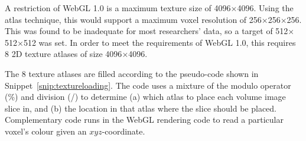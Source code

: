 A restriction of WebGL 1.0 is a maximum texture size of 4096$\times$4096.
Using the atlas technique, this would support a maximum voxel resolution of 256$\times$256$\times$256.
This was found to be inadequate for most researchers' data, so a target of 512$\times$512$\times$512 was set.
In order to meet the requirements of WebGL 1.0, this requires 8 2D texture atlases of size 4096$\times$4096.

The 8 texture atlases are filled according to the pseudo-code shown in Snippet~\ref{snip:textureloading}.
The code uses a mixture of the modulo operator (\%) and division (/) to determine (a) which atlas to place each volume image slice in, and (b) the location in that atlas where the slice should be placed.
Complementary code runs in the WebGL rendering code to read a particular voxel's colour given an $xyz$-coordinate.

